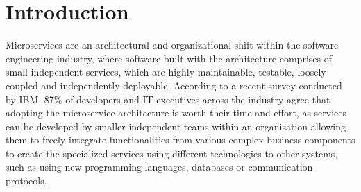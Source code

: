 \chapter{Introduction}



    
    


Microservices are an architectural and organizational shift within the software engineering industry, where software built with the architecture comprises of small independent services, which are highly maintainable, testable, loosely coupled and independently deployable. According to a recent survey conducted by IBM, 87\% of developers and IT executives across the industry agree that adopting the microservice architecture is worth their time and effort, as services can be developed by smaller independent teams within an organisation allowing them to freely integrate functionalities from various complex business components to create the specialized services using different technologies to other systems, such as using new programming languages, databases or communication protocols. 

